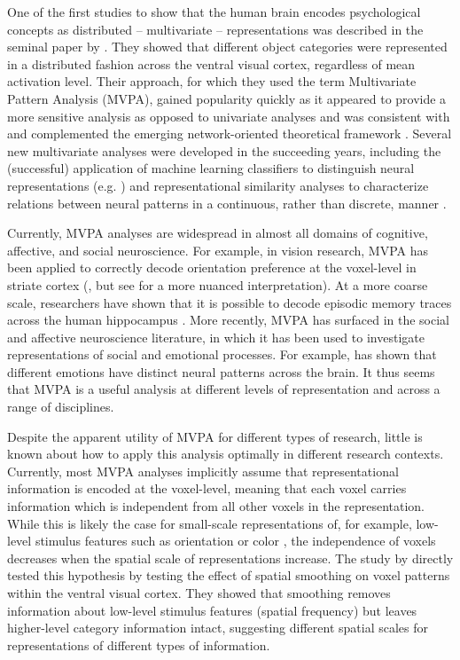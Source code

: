 \documentclass[12pt,a4paper]{article}\usepackage[]{graphicx}\usepackage[]{color}
\begin{document}
One of the first studies to show that the human brain encodes psychological concepts as distributed -- multivariate -- representations was described in the seminal paper by \cite{haxby2001}. They showed that different object categories were represented in a distributed fashion across the ventral visual cortex, regardless of mean activation level. Their approach, for which they used the term Multivariate Pattern Analysis (MVPA), gained popularity quickly as it appeared to provide a more sensitive analysis as opposed to univariate analyses \citep{norman2006,mahmoudi2012} and was consistent with and complemented the emerging network-oriented theoretical framework \citep{bressler2010}. Several new multivariate analyses were developed in the succeeding years, including the (successful) application of machine learning classifiers to distinguish neural representations (e.g. \citealp{cox2003}) and representational similarity analyses to characterize relations between neural patterns in a continuous, rather than discrete, manner \citep{kriegeskorte2008}. 

Currently, MVPA analyses are widespread in almost all domains of cognitive, affective, and social neuroscience. For example, in vision research, MVPA has been applied to correctly decode orientation preference at the voxel-level in striate cortex (\citealp{kamitani2005}, but see \citealp{opdebeeck2010} for a more nuanced interpretation). At a more coarse scale, researchers have shown that it is possible to decode episodic memory traces across the human hippocampus \citep{chadwick2010}. More recently, MVPA has surfaced in the social and affective neuroscience literature, in which it has been used to investigate representations of social and emotional processes. For example, \cite{kassam2013} has shown that different emotions have distinct neural patterns across the brain. It thus seems that MVPA is a useful analysis at different levels of representation and across a range of disciplines.     

Despite the apparent utility of MVPA for different types of research, little is known about how to apply this analysis optimally in different research contexts. Currently, most MVPA analyses implicitly assume that representational information is encoded at the voxel-level, meaning that each voxel carries information which is independent from all other voxels in the representation. While this is likely the case for small-scale representations of, for example, low-level stimulus features such as orientation \cite{kamitani2005} or color \citep{brouwer2009}, the independence of voxels decreases when the spatial scale of representations increase. The study by \cite{brants2011} directly tested this hypothesis by testing the effect of spatial smoothing on voxel patterns within the ventral visual cortex. They showed that smoothing removes information about low-level stimulus features (spatial frequency) but leaves higher-level category information intact, suggesting different spatial scales for representations of different types of information.              
\end{document}
